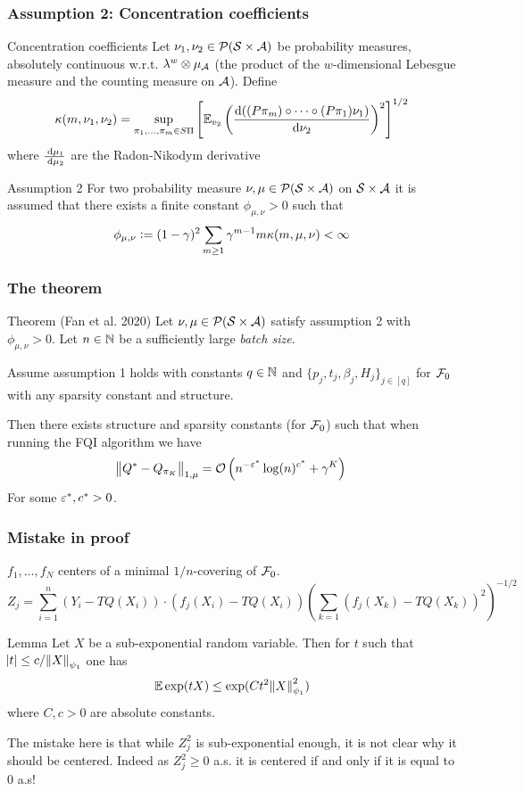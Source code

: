 \documentclass{beamer}[10]
\begin{document}
\begin{frame}
  \frametitle{Assumption 2: Concentration coefficients}
  \begingroup \footnotesize
  \begin{block}{Concentration coefficients}
    Let $\nu_1, \nu_2 \in \mathcal{P}(\mathcal{S}\times \mathcal{A})$ be probability measures,
    absolutely continuous w.r.t. $\lambda^w \otimes \mu_\mathcal{A}$
    (the product of the $w$-dimensional Lebesgue measure and the counting measure
    on $\mathcal{A}$).
    Define
    \[ \kappa(m, \nu_1, \nu_2) = \sup_{\pi_1, \dots, \pi_m \in S\Pi}
      \left[ \mathbb{E}_{v_2} \left( \frac{\mathrm{d}
	  ((P \pi_m) \circ \dots \circ (P \pi_1) \nu_1)}
    {\mathrm{d} \nu_2} \right)^2 \right]^{1/2} \]
    where $\frac{\; \mathrm{d} \mu_1}{\; \mathrm{d} \mu_2}$ are the Radon-Nikodym derivative
  \end{block}
  \begin{block}{Assumption 2}
    For two probability measure $\nu, \mu \in \mathcal{P}(\mathcal{S} \times \mathcal{A})$ 
    on $\mathcal{S} \times \mathcal{A}$
    it is assumed that there exists a finite constant $\phi_{\mu, \nu} > 0$
    such that
    \[ \phi_{\mu, \nu} \vcentcolon= 
      (1 - \gamma)^2 \sum_{m\geq 1} \gamma^{m-1} m \kappa(m, \mu, \nu)
    < \infty \]
  \end{block}
  \endgroup
\end{frame}

\begin{frame}
  \frametitle{The theorem}
  \begingroup \footnotesize
  \begin{block}{Theorem (Fan et al. 2020)}
  Let $\nu, \mu \in \mathcal{P}(\mathcal{S} \times \mathcal{A})$ satisfy assumption 2 with
  $\phi_{\mu, \nu} > 0$.
  Let $n \in \mathbb{N}$ be a sufficiently large \emph{batch size}.
  
  Assume assumption 1 holds with constants
  $q \in \mathbb{N}$ and $\{p_j, t_j, \beta_j, H_j\}_{j \in [q]}$
  for $\mathcal{F}_0$ with 
  any sparsity constant and structure.

  Then there exists structure and sparsity constants (for $\mathcal{F}_0$)
  such that when running the FQI algorithm we have
  \[ \norm{Q^* - Q_{\pi_K}}_{1, \mu} =
  \mathcal{O}\left( n^{-\varepsilon^*} \log(n)^{c^*} + \gamma^K \right) \]
  For some $\varepsilon^*, c^* > 0$.
  \end{block}
  \endgroup
\end{frame}

\begin{frame}
  \frametitle{Mistake in proof}
  \begingroup \footnotesize
  $f_1, \dots, f_N$ centers of a minimal $1/n$-covering of $\mathcal{F}_0$.
  \[ Z_j = \sum_{i = 1}^n (Y_i - TQ(X_i))\cdot (f_j(X_i) - TQ(X_i))
  \left(\sum_{k=1} (f_j(X_k) - TQ(X_k))^2 \right)^{-1/2} \]
  \begin{block}{Lemma}
    Let $X$ be a  sub-exponential random variable. Then for $t$
    such that $\abs{t} \leq c/\norm{X}_{\psi_1}$ one has
    \[ \mathbb{E} \exp(t X) \leq \exp(C t^2 \norm{X}_{\psi_1}^2) \]
    where $C, c > 0$ are absolute constants.
  \end{block}
  The mistake here is that while $Z_j^2$ is sub-exponential enough, it
  is not clear why it should be centered.
  Indeed as $Z_j^2 \geq 0$ a.s. it is centered if and only if it is
  equal to 0 a.s!
  \endgroup
\end{frame}
\end{document}
